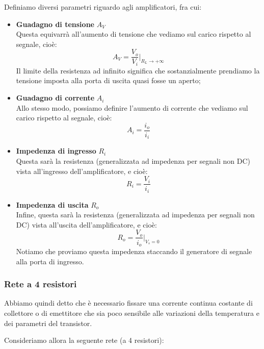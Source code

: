 \documentclass[a4paper,11pt]{article}
\begin{document}
Definiamo diversi parametri riguardo agli amplificatori, fra cui:
\begin{itemize}
\item \textbf{\textsf{Guadagno di tensione}} $A_V$ \\
Questa equivarrà all'aumento di tensione che vediamo sul carico rispetto al segnale, cioè:
$$
A_V = \frac{V_o}{V_i} \Big|_{R_L \rightarrow +\infty}
$$
Il limite della resistenza ad infinito significa che sostanzialmente prendiamo la tensione imposta alla porta di uscita quasi fosse un aperto;

\item \textbf{\textsf{Guadagno di corrente}} $A_i$ \\
Allo stesso modo, possiamo definire l'aumento di corrente che vediamo sul carico rispetto al segnale, cioè:
$$
A_i = \frac{i_o}{i_i} 
$$

\item \textbf{\textsf{Impedenza di ingresso}} $R_i$ \\
Questa sarà la resistenza (generalizzata ad impedenza per segnali non DC) vista all'ingresso dell'amplificatore, e cioè:
$$
R_i = \frac{V_i}{i_i}
$$

\item \textbf{\textsf{Impedenza di uscita}} $R_o$ \\
Infine, questa sarà la resistenza (generalizzata ad impedenza per segnali non DC) vista all'uscita dell'amplificatore, e cioè:
$$
R_o = \frac{V_o}{i_o} \Big|_{V_s = 0}
$$
Notiamo che proviamo questa impedenza staccando il generatore di segnale alla porta di ingresso.

\end{itemize}

\subsubsection{Rete a 4 resistori}
Abbiamo quindi detto che è necessario fissare una corrente continua costante di collettore o di emettitore che sia poco sensibile alle variazioni della temperatura e dei parametri del transistor.

Consideriamo allora la seguente rete (a 4 resistori):
\end{document}

